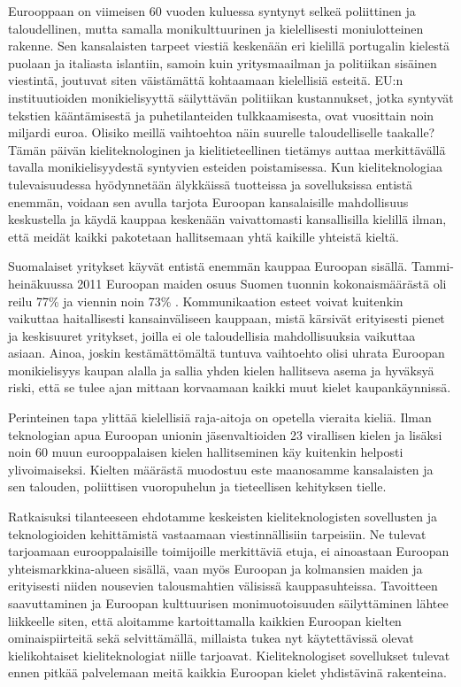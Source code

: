 \begin{multicols}{2}

Eurooppaan on viimeisen 60 vuoden kuluessa syntynyt selkeä poliittinen
ja taloudellinen, mutta samalla monikulttuurinen ja kielellisesti
moniulotteinen rakenne. Sen kansalaisten tarpeet viestiä keskenään eri
kielillä portugalin kielestä puolaan ja italiasta islantiin, samoin
kuin yritysmaailman ja politiikan sisäinen viestintä, joutuvat siten
väistämättä kohtaamaan kielellisiä esteitä. EU:n instituutioiden
monikielisyyttä säilyttävän politiikan kustannukset, jotka syntyvät
tekstien kääntämisestä ja puhetilanteiden tulkkaamisesta, ovat
vuosittain noin miljardi euroa. Olisiko meillä vaihtoehtoa näin suurelle
taloudelliselle taakalle? Tämän päivän kieliteknologinen ja kielitieteellinen 
tietämys auttaa merkittävällä tavalla monikielisyydestä syntyvien esteiden 
poistamisessa. Kun kieliteknologiaa tulevaisuudessa hyödynnetään älykkäissä
tuotteissa ja sovelluksissa entistä enemmän, voidaan sen avulla
tarjota Euroopan kansalaisille mahdollisuus keskustella ja käydä
kauppaa keskenään vaivattomasti kansallisilla kielillä ilman, että
meidät kaikki pakotetaan hallitsemaan yhtä kaikille yhteistä kieltä.


Suomalaiset yritykset käyvät entistä enemmän kauppaa Euroopan sisällä.
Tammi-heinäkuussa 2011 Euroopan maiden osuus Suomen tuonnin
kokonaismäärästä oli reilu 77\% ja viennin noin 73\% \cite{SVT}.
Kommunikaation esteet voivat kuitenkin vaikuttaa haitallisesti
kansainväliseen kauppaan, mistä kärsivät erityisesti pienet ja
keskisuuret yritykset, joilla ei ole taloudellisia mahdollisuuksia
vaikuttaa asiaan. Ainoa, joskin kestämättömältä tuntuva vaihtoehto olisi uhrata
Euroopan monikielisyys kaupan alalla ja sallia yhden kielen hallitseva asema ja
hyväksyä riski, että se tulee ajan mittaan korvaamaan kaikki muut
kielet kaupankäynnissä.

Perinteinen tapa ylittää kielellisiä raja-aitoja on opetella vieraita
kieliä. Ilman teknologian apua Euroopan unionin
jäsenvaltioiden 23 virallisen kielen ja lisäksi noin 60 muun eurooppalaisen
kielen hallitseminen käy kuitenkin helposti ylivoimaiseksi. Kielten määrästä
muodostuu este maanosamme kansalaisten ja sen talouden, poliittisen
vuoropuhelun ja tieteellisen kehityksen tielle.


Ratkaisuksi tilanteeseen ehdotamme keskeisten kieliteknologisten
sovellusten ja teknologioiden kehittämistä vastaamaan viestinnällisiin
tarpeisiin. Ne tulevat tarjoamaan eurooppalaisille toimijoille
merkittäviä etuja, ei ainoastaan Euroopan yhteismarkkina-alueen
sisällä, vaan myös Euroopan ja kolmansien maiden ja erityisesti
niiden nousevien talousmahtien välisissä kauppasuhteissa. Tavoitteen 
saavuttaminen ja Euroopan kulttuurisen monimuotoisuuden säilyttäminen lähtee
liikkeelle siten, että aloitamme kartoittamalla kaikkien Euroopan kielten ominaispiirteitä
sekä selvittämällä, millaista tukea nyt käytettävissä olevat
kielikohtaiset kieliteknologiat niille tarjoavat. Kieliteknologiset
sovellukset tulevat ennen pitkää palvelemaan meitä kaikkia Euroopan 
kielet yhdistävinä rakenteina.


\end{multicols}
